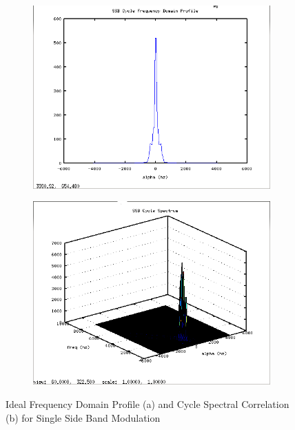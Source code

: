 \begin{figure}
\centering
\begin{subfigure}{.49\textwidth}
\centering
\includegraphics[width=\linewidth]{../img/Report_SSB_Ia_Ideal.png}
  \caption{ }
\end{subfigure}
\begin{subfigure}{.49\textwidth}
  \centering
  \includegraphics[width=\linewidth]{../img/Report_SSB_Sxa_Ideal.png}
  \caption{ }
\end{subfigure}
\caption{Ideal Frequency Domain Profile (a) and Cycle Spectral Correlation (b)
for Single Side Band Modulation}
\label{fig:IdealSSBCyclo}
\end{figure}

